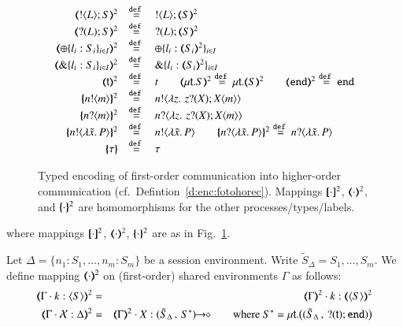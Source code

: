\begin{definition}
\begin{figure}[t]
\[\begin{array}{rcll}
		\tmap{\btout{L} S}{2} &\defeq& \btout{L} \tmap{S}{2}\\
		\tmap{\btinp{L} S}{2} &\defeq& \btinp{L} \tmap{S}{2}\\
		\tmap{\btsel{l_i: S_i}_{i \in I}}{2} &\defeq& \btsel{l_i: \tmap{S_i}{2}}_{i \in I}\\
		\tmap{\btbra{l_i: S_i}_{i \in I}}{2} &\defeq& \btbra{l_i: \tmap{S_i}{2}}_{i \in I}\\

		\tmap{\vart{t}}{2} &\defeq& {t} \qquad
		\tmap{\trec{t}{S}}{2} \defeq \trec{t}{\tmap{S}{2}} \qquad
		\tmap{\tinact}{2} \defeq \tinact\\

		\mapa{\bactout{n}{m}}^{2} &\defeq&   \bactout{n}{\abs{z}{\,\binp{z}{X} \appl{X}{m}} } \\
		\mapa{\bactinp{n}{m}}^{2} &\defeq&   \bactinp{n}{\abs{z}{\,\binp{z}{X} \appl{X}{m}} } \\

		\mapa{\bactout{n}{\abs{\tilde{x}}{P}}}^{2} &\defeq& \bactout{n}{\abs{\tilde{x}}{P}} \qquad
		\mapa{\bactinp{n}{\abs{\tilde{x}}{P}}}^{2} \defeq \bactinp{n}{\abs{\tilde{x}}{P}}\\
		\mapa{\tau} &\defeq& \tau
	\end{array}
\]
\caption{\label{f:enc:fotohorec}
Typed encoding of first-order communication into higher-order communication (cf.~Defintion~\ref{d:enc:fotohorec}).
Mappings 
$[\!\![\cdot]\!\!]^2$,
$(\!\!\langle\cdot\rangle\!\!)^2$, 
and 
$\{\!\!\{\cdot\}\!\!\}^2$
are homomorphisms for the other processes/types/labels. 
}

\end{figure}
where mappings $[\!\![\cdot]\!\!]^{2}$, $(\!\!\langle\cdot\rangle\!\!)^{2}$, $\{\!\!\{\cdot\}\!\!\}^{2}$
are as in Fig.~\ref{f:enc:fotohorec}.
\end{definition}

\begin{remark}
Let $\Delta = \{n_1:S_1, \ldots, n_m:S_m\}$ be a session environment.
Write $\tilde{S}_{\Delta} = S_1, \ldots, S_m$.
	We define  mapping $(\!\!\langle\cdot\rangle\!\!)^{2}$ on (first-order) shared environments $\Gamma$ as follows:
	\begin{eqnarray*}
	\mapt{\Gamma \cat k:\chtype{S}}^{2} & =  & \mapt{\Gamma}^{2} \cat k:\mapt{\chtype{S}}^{2} \\
	\tmap{\Gamma \cat \rvar{X}:\Delta}{2} & = & \tmap{\Gamma}{2} \cat X:\shot{(\tilde{S}_{\Delta}\,,\,S^*)}\qquad 
		\text{where
	$S^* = \trec{t}{\big((\tilde{S}_{\Delta}\,,\, \btinp{\vart{t}}\tinact)\big)}$}
	\end{eqnarray*}
\end{remark}

